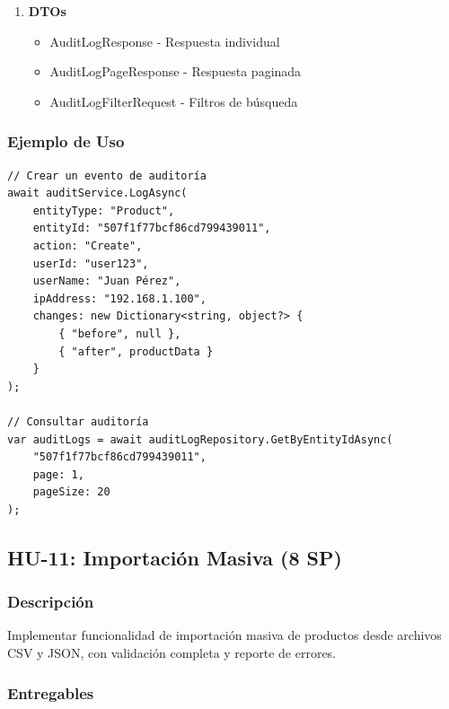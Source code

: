 \documentclass[12pt,a4paper]{article}
\begin{document}
\begin{enumerate}
    \item \textbf{DTOs}
    \begin{itemize}
        \item AuditLogResponse - Respuesta individual
        \item AuditLogPageResponse - Respuesta paginada
        \item AuditLogFilterRequest - Filtros de búsqueda
    \end{itemize}
\end{enumerate}

\subsubsection{Ejemplo de Uso}

\begin{lstlisting}
// Crear un evento de auditoría
await auditService.LogAsync(
    entityType: "Product",
    entityId: "507f1f77bcf86cd799439011",
    action: "Create",
    userId: "user123",
    userName: "Juan Pérez",
    ipAddress: "192.168.1.100",
    changes: new Dictionary<string, object?> {
        { "before", null },
        { "after", productData }
    }
);

// Consultar auditoría
var auditLogs = await auditLogRepository.GetByEntityIdAsync(
    "507f1f77bcf86cd799439011", 
    page: 1, 
    pageSize: 20
);
\end{lstlisting}

\subsection{HU-11: Importación Masiva (8 SP)}

\subsubsection{Descripción}

Implementar funcionalidad de importación masiva de productos desde archivos CSV y JSON, con validación completa y reporte de errores.

\subsubsection{Entregables}
\end{document}
